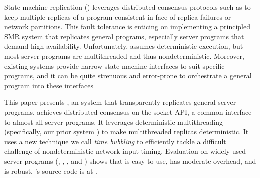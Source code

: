 State machine replication (\smr) leverages distributed consensus protocols
such as \paxos to keep multiple replicas of a program consistent in face
of replica failures or network partitions.  This fault tolerance is
enticing on implementing a principled SMR system that replicates general
programs, especially server programs that demand high
availability. Unfortunately, \smr assumes deterministic execution, but
most server programs are multithreaded and thus nondeterministic.
Moreover, existing \smr systems provide narrow state machine interfaces to
suit specific programs, and it can be quite strenuous and error-prone to
orchestrate a general program into these interfaces

This paper presents \xxx, an \smr system that transparently replicates
general server programs. \xxx achieves distributed consensus on the socket
API, a common interface to almost all server programs.  It leverages
deterministic multithreading (specifically, our prior system \parrot) to
make multithreaded replicas deterministic.  It uses a new technique we
call \emph{time bubbling} to efficiently tackle a difficult challenge of
nondeterministic network input timing. Evaluation on \nprog widely used
server programs (\eg, \apache, \clamav, and \mysql) shows that \xxx is
easy to use, has moderate overhead, and is robust. \xxx's source code is
at \github.
